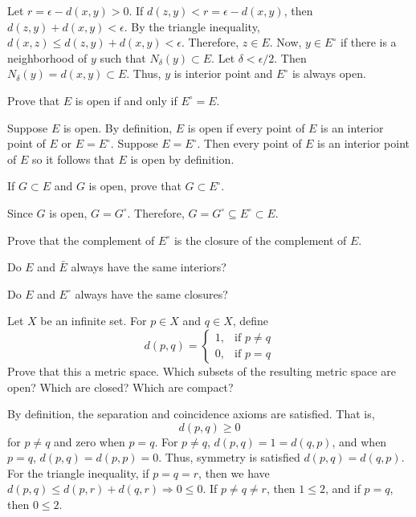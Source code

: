 \begin{exercise}
\begin{exercise}[label = (\alph*)]
    Let \(r = \epsilon - d(x,y) > 0\).
    If \(d(z,y) < r = \epsilon - d(x,y)\), then \(d(z,y) + d(x,y) < \epsilon\).
    By the triangle inequality, \(d(x,z)\leq d(z,y) + d(x,y) < \epsilon\).
    Therefore, \(z\in E\).
    Now, \(y\in E^{\circ}\) if there is a neighborhood of \(y\) such that
    \(N_{\delta}(y)\subset E\).
    Let \(\delta < \epsilon/2\).
    Then \(N_{\delta}(y) = d(x,y)\subset E\).
    Thus, \(y\) is interior point and \(E^{\circ}\) is always open.
  \item
    Prove that \(E\) is open if and only if \(E^{\circ} = E\).
    \par\smallskip
    Suppose \(E\) is open.
    By definition, \(E\) is open if every point of \(E\) is an interior point
    of \(E\) or \(E = E^{\circ}\).
    Suppose \(E = E^{\circ}\).
    Then every point of \(E\) is an interior point of \(E\) so it follows that
    \(E\) is open by definition.
  \item
    If \(G\subset E\) and \(G\) is open, prove that \(G\subset E^{\circ}\).
    \par\smallskip
    Since \(G\) is open, \(G = G^{\circ}\).
    Therefore, \(G = G^{\circ}\subseteq E^{\circ}\subset E\).
  \item
    Prove that the complement of \(E^{\circ}\) is the closure of the
    complement of \(E\).
  \item
    Do \(E\) and \(\bar{E}\) always have the same interiors?
  \item
    Do \(E\) and \(E^{\circ}\) always have the same closures?
  \end{exercise}
\item
  Let \(X\) be an infinite set.
  For \(p\in X\) and \(q\in X\), define
  \[
  d(p, q) =
  \begin{cases}
    1, & \text{if } p\neq q\\
    0, & \text{if } p = q
  \end{cases}
  \]
  Prove that this a metric space.
  Which subsets of the resulting metric space are open?
  Which are closed? Which are compact?
  \par\smallskip
  By definition, the separation and coincidence axioms are satisfied.
  That is,
  \[
  d(p, q)\geq 0
  \]
  for \(p\neq q\) and zero when \(p = q\).
  For \(p\neq q\), \(d(p,q) = 1 = d(q,p)\), and when \(p = q\),
  \(d(p,q) = d(p,p) = 0\).
  Thus, symmetry is satisfied \(d(p,q) = d(q,p)\).
  For the triangle inequality, if \(p = q = r\), then we have
  \(d(p,q)\leq d(p,r) + d(q,r)\Rightarrow 0\leq 0\).
  If \(p\neq q\neq r\), then \(1\leq 2\), and if \(p = q\), then \(0\leq 2\).

\end{exercise}
